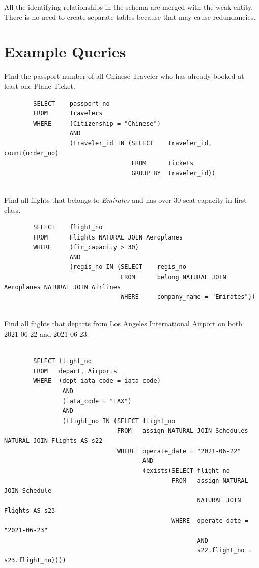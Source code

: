 \documentclass{article}
\begin{document}
	All the identifying relationships in the schema are merged with the weak entity. There is no need to create separate tables because that may cause redundancies.
	
	\section{Example Queries}
	
	Find the passport number of all Chinese Traveler who has already booked at least one Plane Ticket. 
	\begin{verbatim}
		SELECT    passport_no 
		FROM      Travelers
		WHERE     (Citizenship = "Chinese") 
		          AND 
		          (traveler_id IN (SELECT    traveler_id, count(order_no)
		                           FROM      Tickets
		                           GROUP BY  traveler_id))
		
	\end{verbatim}
	Find all flights that belongs to \textit{Emirates} and has over 30-seat capacity in first class. 
	\begin{verbatim}
		SELECT    flight_no
		FROM      Flights NATURAL JOIN Aeroplanes
		WHERE     (fir_capacity > 30) 
		          AND
		          (regis_no IN (SELECT    regis_no
		                        FROM      belong NATURAL JOIN Aeroplanes NATURAL JOIN Airlines
		                        WHERE     company_name = "Emirates"))
		                        
	\end{verbatim}
	Find all flights that departs from Los Angeles International Airport on both 2021-06-22 and 2021-06-23.
	\begin{verbatim}
		
		SELECT flight_no
		FROM   depart, Airports
		WHERE  (dept_iata_code = iata_code)
		        AND
		        (iata_code = "LAX")
		        AND 
		        (flight_no IN (SELECT flight_no
		                       FROM   assign NATURAL JOIN Schedules NATURAL JOIN Flights AS s22
		                       WHERE  operate_date = "2021-06-22" 
		                              AND 
		                              (exists(SELECT flight_no
		                                      FROM   assign NATURAL JOIN Schedule 
		                                             NATURAL JOIN Flights AS s23
		                                      WHERE  operate_date = "2021-06-23" 
		                                             AND
		                                             s22.flight_no = s23.flight_no))))
		          
	\end{verbatim}
	
	
	
	
	
	
	
	
	
	
\end{document}
